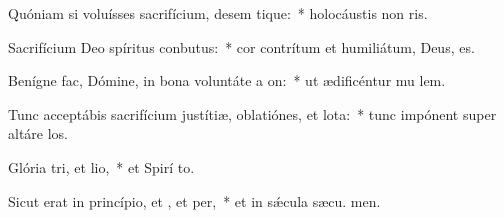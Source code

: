 \item Quóniam si voluísses sacrifícium, desem tique:~* holocáustis non ris.
\item Sacrifícium Deo spíritus conbutus:~* cor contrítum et humiliátum, Deus,  es.
\item Benígne fac, Dómine, in bona voluntáte a on:~* ut ædificéntur mu lem.
\item Tunc acceptábis sacrifícium justítiæ, oblatiónes, et lota:~* tunc impónent super altáre  los.
\item Glória tri, et lio,~* et Spirí to.
\item Sicut erat in princípio, et , et per,~* et in sǽcula sæcu. men.
